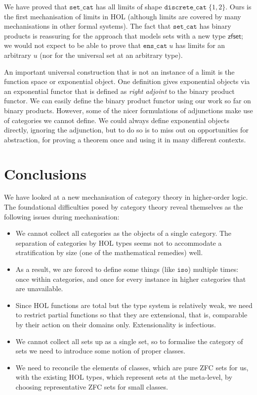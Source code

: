 \documentclass[twoside,titlepage,11pt]{article}
\begin{document}
We have proved that $\mathtt{set\_cat}$ has all limits of shape $\mathtt{discrete\_cat}\;\{1,2\}$.
Ours is the first mechanisation of limits in HOL (although limits are covered by many mechanisations in other formal systems).
The fact that $\mathtt{set\_cat}$ has binary products is reassuring for the approach that models sets with a new type $\mathsf{zfset}$; we would not expect to be able to prove that $\mathtt{ens\_cat}\;u$ has limits for an arbitrary $u$ (nor for the universal set at an arbitrary type).

An important universal construction that is not an instance of a limit is the function space or exponential object.
One definition gives exponential objects via an exponential functor that is defined as \emph{right adjoint} to the binary product functor.
We can easily define the binary product functor using our work so far on binary products.
However, some of the nicer formulations of adjunctions make use of categories we cannot define.
We could always define exponential objects directly, ignoring the adjunction, but to do so is to miss out on opportunities for abstraction, for proving a theorem once and using it in many different contexts.
\section{Conclusions}%
We have looked at a new mechanisation of category theory in higher-order logic.
The foundational difficulties posed by category theory reveal themselves as the following issues during mechanisation:
\begin{itemize}
\item We cannot collect all categories as the objects of a single category.
The separation of categories by HOL types seems not to accommodate a stratification by size (one of the mathematical remedies) well.
\item
As a result, we are forced to define some things (like $\mathtt{iso}$) multiple times: once within categories, and once for every instance in higher categories that are unavailable.
\item
Since HOL functions are total but the type system is relatively weak, we need to restrict partial functions so that they are extensional, that is, comparable by their action on their domains only.
Extensionality is infectious.
\item
We cannot collect all sets up as a single set, so to formalise the category of sets we need to introduce some notion of proper classes.
\item
We need to reconcile the elements of classes, which are pure ZFC sets for us, with the existing HOL types, which represent sets at the meta-level, by choosing representative ZFC sets for small classes.
\end{itemize}
\end{document}
